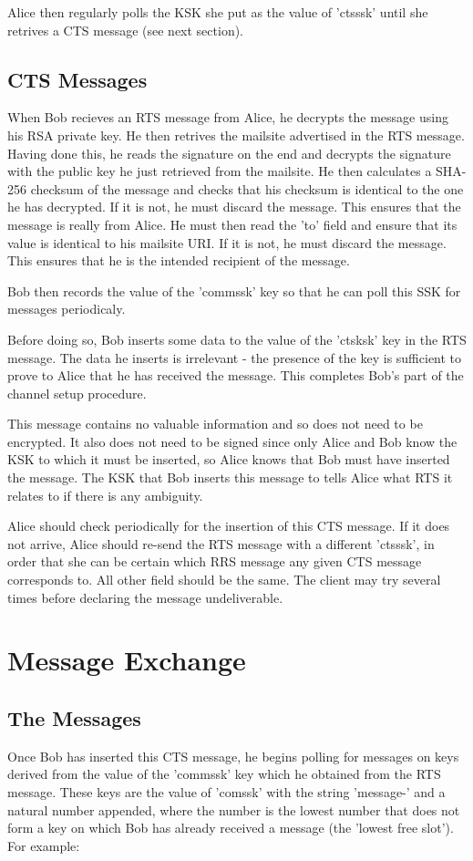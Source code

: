 \documentclass[12pt,a4paper]{article}
\begin{document}
Alice then regularly polls the KSK she put as the value of 'ctsssk' until she retrives a CTS message (see next section).

\subsection{CTS Messages}
When Bob recieves an RTS message from Alice, he decrypts the message using his RSA private key. He then retrives the mailsite advertised in the RTS message. Having done this, he reads the signature on the end and decrypts the signature with the public key he just retrieved from the mailsite. He then calculates a SHA-256 checksum of the message and checks that his checksum is identical to the one he has decrypted. If it is not, he must discard the message. This ensures that the message is really from Alice. He must then read the 'to' field and ensure that its value is identical to his mailsite URI. If it is not, he must discard the message. This ensures that he is the intended recipient of the message.

Bob then records the value of the 'commssk' key so that he can poll this SSK for messages periodicaly.

Before doing so, Bob inserts some data to the value of the 'ctsksk' key in the RTS message. The data he inserts is irrelevant - the presence of the key is sufficient to prove to Alice that he has received the message. This completes Bob's part of the channel setup procedure.

This message contains no valuable information and so does not need to be encrypted. It also does not need to be signed since only Alice and Bob know the KSK to which it must be inserted, so Alice knows that Bob must have inserted the message. The KSK that Bob inserts this message to tells Alice what RTS it relates to if there is any ambiguity.

Alice should check periodically for the insertion of this CTS message. If it does not arrive, Alice should re-send the RTS message with a different 'ctsssk', in order that she can be certain which RRS message any given CTS message corresponds to. All other field should be the same. The client may try several times before declaring the message undeliverable.

\section{Message Exchange}
\subsection{The Messages}
Once Bob has inserted this CTS message, he begins polling for messages on keys derived from the value of the 'commssk' key which he obtained from the RTS message. These keys are the value of 'comssk' with the string 'message-' and a natural number appended, where the number is the lowest number that does not form a key on which Bob has already received a message (the 'lowest free slot'). For example:
\end{document}
